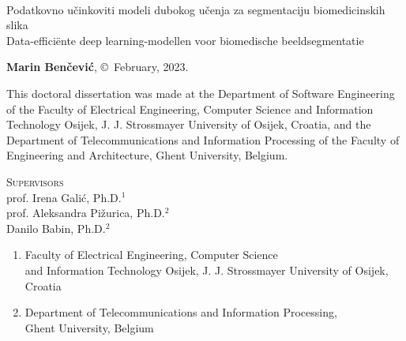 \documentclass[
  11pt, %
  oneside, %
  english, %
  singlespacing, %
  liststotoc, %
  headsepline, %
  chapterinoneline, %
]{MastersDoctoralThesis} %
\newcommand{\ttitlenl}[0]{Data-efficiënte deep learning-modellen voor biomedische beeldsegmentatie}
\newcommand{\ttitlehr}[0]{Podatkovno učinkoviti modeli dubokog učenja za segmentaciju biomedicinskih slika}
\begin{document}
\frontmatter %

\pagestyle{plain} %

\sloppy




\clearpage

{\setlength{\parindent}{0cm}
{\Large \ttitle\\[1em]}
{\Large \ttitlehr\\[1em]}
{\Large \ttitlenl\\[1em]}
}

\textbf{Marin Benčević}, \copyright~February, 2023.

\vfill
\vfill

This doctoral dissertation was made at the Department of Software Engineering of the Faculty of Electrical Engineering, Computer Science and Information Technology Osijek, J. J. Strossmayer University of Osijek, Croatia, and the Department of Telecommunications and Information Processing of the Faculty of Engineering and Architecture, Ghent University, Belgium.

\vfill

{\setlength{\parindent}{0cm}
\textsc{Supervisors}\\[0.35em]

prof. Irena Galić, Ph.D.$^1$\\
prof. Aleksandra Pižurica, Ph.D.$^2$\\
Danilo Babin, Ph.D.$^2$\\

\begin{enumerate}[label={\expandafter\textsuperscript 1},leftmargin=*]
	\item Faculty of Electrical Engineering, Computer Science\\and Information Technology Osijek, J. J. Strossmayer University of Osijek, Croatia
	\item Department of Telecommunications and Information Processing,\\ Ghent University, Belgium
\end{enumerate}
}

\clearpage
\end{document}
